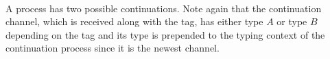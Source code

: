 \begin{AgdaAlign}
\begin{code}%
%
\>[3]%
\>[13]\AgdaSymbol{:}%
\>[122I]\AgdaSpace{}%
\AgdaSpace{}%
\AgdaSpace{}%
\AgdaSymbol{\}}\AgdaSpace{}%
\AgdaSymbol{(}\AgdaSpace{}%
\AgdaSymbol{:}\AgdaSpace{}%
\AgdaSpace{}%
\AgdaSpace{}%
\AgdaSpace{}%
\AgdaOperator{\AgdaInductiveConstructor{\&}}\AgdaSpace{}%
\AgdaSpace{}%
\AgdaOperator{\AgdaFunction{,}}\AgdaSpace{}%
\AgdaSymbol{)}\AgdaSpace{}%
\<%
\\
\>[.][@{}l@{}]\<[122I]%
\>[15]\AgdaSpace{}%
\AgdaSymbol{(}\AgdaSpace{}%
\AgdaSpace{}%
\AgdaSymbol{)}\AgdaSpace{}%
\AgdaSpace{}%
\AgdaSpace{}%
\AgdaSymbol{(}\AgdaSpace{}%
\AgdaSpace{}%
\AgdaSymbol{)}\AgdaSpace{}%
\AgdaSpace{}%
\AgdaSpace{}%
\<%
\end{code}

A  process has two possible continuations. Note
again that the continuation channel, which is received along with the tag, has
either type $A$ or type $B$ depending on the tag and its type is prepended to
the typing context of the continuation process since it is the newest channel.

\begin{code}%
%
\>[3]%
\>[13]\AgdaSymbol{:}%
\>[147I]\AgdaSpace{}%
\AgdaSpace{}%
\AgdaSpace{}%
\AgdaSpace{}%
\AgdaSpace{}%
\AgdaSymbol{\}}\AgdaSpace{}%
\AgdaSymbol{(}\AgdaSpace{}%
\AgdaSymbol{:}\AgdaSpace{}%
\AgdaSpace{}%
\AgdaSpace{}%
\AgdaSpace{}%
\AgdaSpace{}%
\AgdaSpace{}%
\AgdaOperator{\AgdaFunction{,}}\AgdaSpace{}%
\AgdaSymbol{)}\AgdaSpace{}%
\AgdaSymbol{(}\AgdaSpace{}%
\AgdaSymbol{:}\AgdaSpace{}%
\AgdaSpace{}%
\AgdaSpace{}%
\AgdaSpace{}%
\AgdaOperator{\AgdaDatatype{+}}\AgdaSpace{}%
\AgdaSymbol{)}\AgdaSpace{}%
\<%
\\
\>[.][@{}l@{}]\<[147I]%
\>[15]\AgdaSpace{}%
\AgdaSymbol{(}\AgdaSpace{}%
\AgdaSpace{}%
\AgdaSymbol{)}\AgdaSpace{}%
\AgdaSpace{}%
\AgdaSpace{}%
\AgdaSymbol{(}\AgdaSpace{}%
\AgdaSpace{}%
\AgdaSymbol{)}\AgdaSpace{}%
\AgdaSpace{}%
\AgdaSpace{}%
\<%
\end{code}


\end{AgdaAlign}
